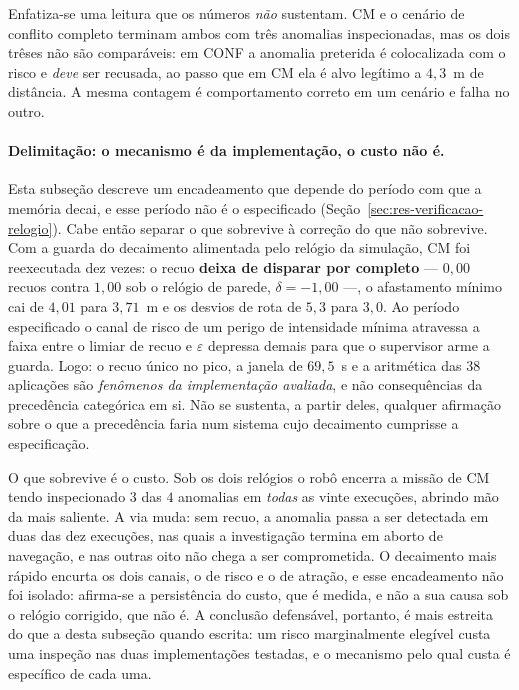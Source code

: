 Enfatiza-se uma leitura que os números \emph{não} sustentam. CM e o cenário de
conflito completo terminam ambos com três anomalias inspecionadas, mas os dois trêses
não são comparáveis: em CONF a anomalia preterida é colocalizada com o risco e
\emph{deve} ser recusada, ao passo que em CM ela é alvo legítimo a $4{,}3$~m de
distância. A mesma contagem é comportamento correto em um cenário e falha no outro.

\paragraph{Delimitação: o mecanismo é da implementação, o custo não é.}
Esta subseção descreve um encadeamento que depende do período com que a memória
decai, e esse período não é o especificado (Seção~\ref{sec:res-verificacao-relogio}).
Cabe então separar o que sobrevive à correção do que não sobrevive. Com a guarda do
decaimento alimentada pelo relógio da simulação, CM foi reexecutada dez vezes: o recuo
\textbf{deixa de disparar por completo} --- $0{,}00$ recuos contra $1{,}00$ sob o
relógio de parede, $\delta=-1{,}00$ ---, o afastamento mínimo cai de $4{,}01$ para
$3{,}71$~m e os desvios de rota de $5{,}3$ para $3{,}0$. Ao período especificado o canal
de risco de um perigo de intensidade mínima atravessa a faixa entre o limiar de recuo e
$\varepsilon$ depressa demais para que o supervisor arme a guarda. Logo: o recuo único
no pico, a janela de $69{,}5$~s e a aritmética das $38$ aplicações são \emph{fenômenos
da implementação avaliada}, e não consequências da precedência categórica em si. Não se
sustenta, a partir deles, qualquer afirmação sobre o que a precedência faria num sistema
cujo decaimento cumprisse a especificação.

O que sobrevive é o custo. Sob os dois relógios o robô encerra a missão de CM tendo
inspecionado $3$ das $4$ anomalias em \emph{todas} as vinte execuções, abrindo mão da
mais saliente. A via muda: sem recuo, a anomalia passa a ser detectada em duas das dez
execuções, nas quais a investigação termina em aborto de navegação, e nas outras oito
não chega a ser comprometida. O decaimento mais rápido encurta os dois canais, o de
risco e o de atração, e esse encadeamento não foi isolado: afirma-se a persistência do
custo, que é medida, e não a sua causa sob o relógio corrigido, que não é. A conclusão
defensável, portanto, é mais estreita do que a desta subseção quando escrita: um risco
marginalmente elegível custa uma inspeção nas duas implementações testadas, e o
mecanismo pelo qual custa é específico de cada uma.

